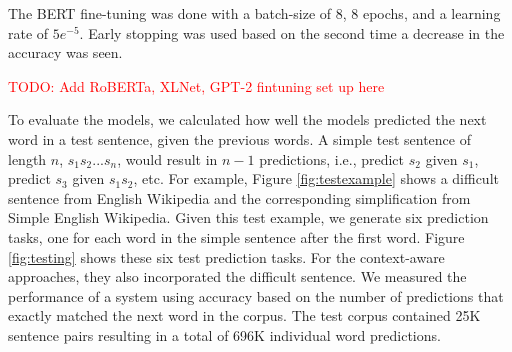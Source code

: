 \documentclass[11pt]{article}
\newcommand{\todo}[1]{\textcolor{red}{TODO: #1}}
\begin{document}
The BERT fine-tuning was done with a
batch-size of 8, 8 epochs, and a learning rate of $5e^{-5}$. Early stopping was used based on the second time a decrease in the accuracy was seen.

\todo{Add RoBERTa, XLNet, GPT-2 fintuning set up here}

To evaluate the models, we calculated how well the models predicted the next word in a test sentence, given the previous words.  A simple test sentence of length $n$, $s_1 s_2 ... s_n$, would result in $n-1$ predictions, i.e., predict $s_2$ given $s_1$, predict $s_3$ given $s_1 s_2$, etc.  For example, Figure \ref{fig:testexample} shows a difficult sentence from English Wikipedia and the corresponding simplification from Simple English Wikipedia.  Given this test example, we generate six prediction tasks, one for each word in the simple sentence after the first word.  Figure \ref{fig:testing} shows these six test prediction tasks.  For the context-aware approaches, they also incorporated the difficult sentence. We measured the performance of a system using accuracy based on the number of predictions that exactly matched the next word in the corpus.  The test corpus contained 25K sentence pairs resulting in a total of 696K individual word predictions.

\begin{table}
    \centering
    \caption{An example sentence pair from the English Wikipedia corpus.}
    \label{tab:testexample}
\end{table}

\begin{table}
\centering
{}
\caption{The resulting prediction tasks that are generated from the example in Table \ref{tab:testexample}.}
\label{fig:testing}
\end{table}
\end{document}
